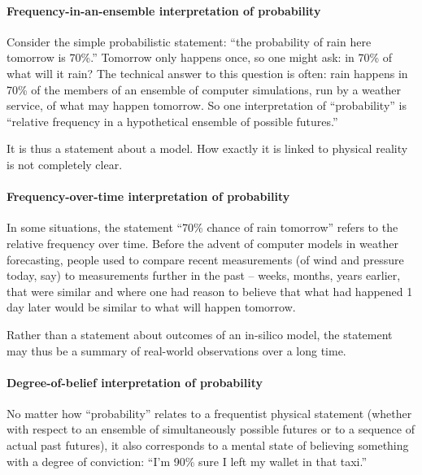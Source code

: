 \documentclass[a4paper, 12pt]{article}
\newcommand{\ie}{{\it i.e.}\ }
\begin{document}

\paragraph{Frequency-in-an-ensemble interpretation of probability}
Consider the simple probabilistic statement: ``the probability of rain here tomorrow is 70\%.'' Tomorrow only happens once, so one might ask: in 70\% of what will it rain? The technical answer to this question is often: rain happens in 70\% of the members of an ensemble of computer simulations, run by a weather service, of what may happen tomorrow. So one interpretation of ``probability'' is ``relative frequency in a hypothetical ensemble of possible futures.'' 

It is thus a statement about a model. How exactly it is linked to physical reality is not completely clear. 


\paragraph{Frequency-over-time interpretation of probability}
In some situations, the statement ``70\% chance of rain tomorrow'' refers to the relative frequency over time. Before the advent of computer models in weather forecasting, people used to compare recent measurements (of wind and pressure today, say) to measurements further in the past -- weeks, months, years earlier, that were similar and where one had reason to believe that what had happened 1 day later would be similar to what will happen tomorrow.

Rather than a statement about outcomes of an in-silico model, the statement may thus be a summary of real-world observations over a long time.

\paragraph{Degree-of-belief interpretation of probability}
No matter how ``probability'' relates to a frequentist physical statement (whether with respect to an ensemble of simultaneously possible futures or to a sequence of actual past futures), it also corresponds to a mental state of believing something with a degree of conviction: ``I'm 90\% sure I left my wallet in that taxi.''
\end{document}
